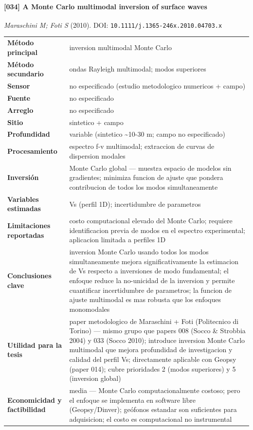 \paragraph{[034] A Monte Carlo multimodal inversion of surface waves} \emph{Maraschini M; Foti S} (2010).
{\scriptsize DOI: \texttt{10.1111/j.1365-246x.2010.04703.x}}

\begin{center}\scriptsize
\begin{tabularx}{\textwidth}{@{}>{\bfseries}p{3.3cm} X@{}}
\toprule
M\'etodo principal & inversion multimodal Monte Carlo \\
M\'etodo secundario & ondas Rayleigh multimodal; modos superiores \\
Sensor & no especificado (estudio metodologico numericos + campo) \\
Fuente & no especificado \\
Arreglo & no especificado \\
Sitio & sintetico + campo \\
Profundidad & variable (sintetico \textasciitilde{}10-30 m; campo no especificado) \\
Procesamiento & espectro f-v multimodal; extraccion de curvas de dispersion modales \\
Inversi\'on & Monte Carlo global --- muestra espacio de modelos sin gradientes; minimiza funcion de ajuste que pondera contribucion de todos los modos simultaneamente \\
Variables estimadas & Vs (perfil 1D); incertidumbre de parametros \\
Limitaciones reportadas & costo computacional elevado del Monte Carlo; requiere identificacion previa de modos en el espectro experimental; aplicacion limitada a perfiles 1D \\
Conclusiones clave & inversion Monte Carlo usando todos los modos simultaneamente mejora significativamente la estimacion de Vs respecto a inversiones de modo fundamental; el enfoque reduce la no-unicidad de la inversion y permite cuantificar incertidumbre de parametros; la funcion de ajuste multimodal es mas robusta que los enfoques monomodales \\
Utilidad para la tesis & paper metodologico de Maraschini + Foti (Politecnico di Torino) --- mismo grupo que papers 008 (Socco \& Strobbia 2004) y 033 (Socco 2010); introduce inversion Monte Carlo multimodal que mejora profundidad de investigacion y calidad del perfil Vs; directamente aplicable con Geopsy (paper 014); cubre prioridades 2 (modos superiores) y 5 (inversion global) \\
Economicidad y factibilidad & media --- Monte Carlo computacionalmente costoso; pero el enfoque se implementa en software libre (Geopsy/Dinver); geófonos estandar son suficientes para adquisicion; el costo es computacional no instrumental \\
\bottomrule
\end{tabularx}
\end{center}

